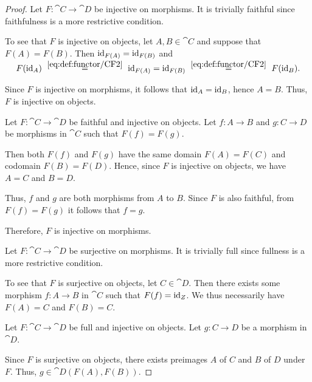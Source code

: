 \begin{proof}
  \SufficiencySubProof* Let \( F: \cat{C} \to \cat{D} \) be injective on morphisms. It is trivially faithful since faithfulness is a more restrictive condition.

  To see that \( F \) is injective on objects, let \( A, B \in \cat{C} \) and suppose that \( F(A) = F(B) \). Then \( \operatorname{id}_{F(A)} = \operatorname{id}_{F(B)} \) and
  \begin{equation*}
    F(\id_A)
    \reloset {\eqref{eq:def:functor/CF2}} =
    \id_{F(A)}
    =
    \id_{F(B)}
    \reloset {\eqref{eq:def:functor/CF2}} =
    F(\id_B).
  \end{equation*}

  Since \( F \) is injective on morphisms, it follows that \( \operatorname{id}_A = \operatorname{id}_B \), hence \( A = B \). Thus, \( F \) is injective on objects.

  \NecessitySubProof* Let \( F: \cat{C} \to \cat{D} \) be faithful and injective on objects. Let \( f: A \to B \) and \( g: C \to D \) be morphisms in \( \cat{C} \) such that \( F(f) = F(g) \).

  Then both \( F(f) \) and \( F(g) \) have the same domain \( F(A) = F(C) \) and codomain \( F(B) = F(D) \). Hence, since \( F \) is injective on objects, we have \( A = C \) and \( B = D \).

  Thus, \( f \) and \( g \) are both morphisms from \( A \) to \( B \). Since \( F \) is also faithful, from \( F(f) = F(g) \) it follows that \( f = g \).

  Therefore, \( F \) is injective on morphisms.

  \SufficiencySubProof* Let \( F: \cat{C} \to \cat{D} \) be surjective on morphisms. It is trivially full since fullness is a more restrictive condition.

  To see that \( F \) is surjective on objects, let \( C \in \cat{D} \). Then there exists some morphism \( f: A \to B \) in \( \cat{C} \) such that \( F(f) = \operatorname{id}_Z \). We thus necessarily have \( F(A) = C \) and \( F(B) = C \).

  \NecessitySubProof* Let \( F: \cat{C} \to \cat{D} \) be full and injective on objects. Let \( g: C \to D \) be a morphism in \( \cat{D} \).

  Since \( F \) is surjective on objects, there exists preimages \( A \) of \( C \) and \( B \) of \( D \) under \( F \). Thus, \( g \in \cat{D}(F(A), F(B)) \).


\end{proof}
